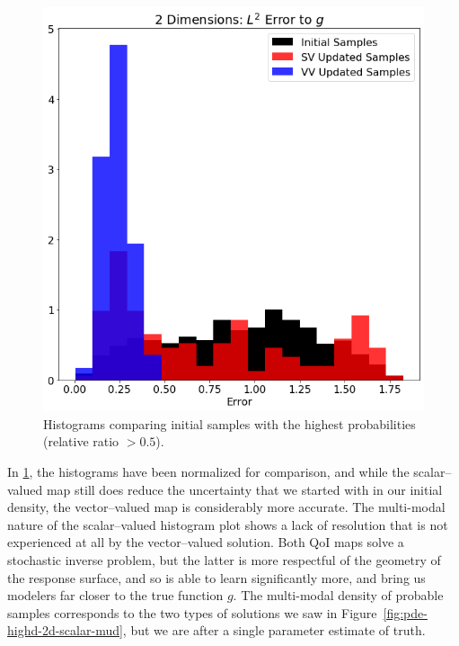 \begin{figure}[htbp]
\centering
  \includegraphics[width=0.675\linewidth]{figures/pde-highd/pde-highd_hist_D2_t5-0E-01}
\caption{
Histograms comparing initial samples with the highest probabilities (relative ratio $> 0.5$).
}
\label{fig:pde-highd-2d-hist}
\end{figure}

In \ref{fig:pde-highd-2d-hist}, the histograms have been normalized for comparison, and while the scalar--valued map still does reduce the uncertainty that we started with in our initial density, the vector--valued map is considerably more accurate.
The multi-modal nature of the scalar--valued histogram plot shows a lack of resolution that is not experienced at all by the vector--valued solution.
Both QoI maps solve a stochastic inverse problem, but the latter is more respectful of the geometry of the response surface, and so is able to learn significantly more, and bring us modelers far closer to the true function $g$.
The multi-modal density of probable samples corresponds to the two types of solutions we saw in Figure~\ref{fig:pde-highd-2d-scalar-mud}, but we are after a single parameter estimate of truth.
